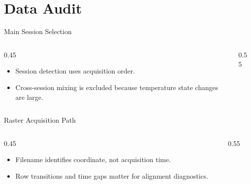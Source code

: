 \section{Data Audit}

\begin{frame}{Main Session Selection}
  \begin{columns}[c]
    \begin{column}{0.45\textwidth}
      \begin{itemize}
        \item Session detection uses acquisition order.
        \item Cross-session mixing is excluded because temperature state changes are large.
      \end{itemize}
    \end{column}
    \begin{column}{0.55\textwidth}
      \centering
    \end{column}
  \end{columns}
\end{frame}

\begin{frame}{Raster Acquisition Path}
  \begin{columns}[c]
    \begin{column}{0.45\textwidth}
      \begin{itemize}
        \item Filename identifies coordinate, not acquisition time.
        \item Row transitions and time gaps matter for alignment diagnostics.
      \end{itemize}
    \end{column}
    \begin{column}{0.55\textwidth}
      \centering
    \end{column}
  \end{columns}
\end{frame}
